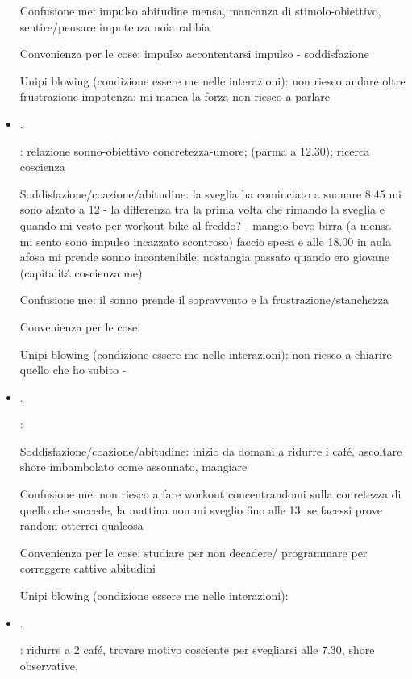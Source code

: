 \begin{itemize}
Confusione me: impulso abitudine mensa, mancanza di stimolo-obiettivo, sentire/pensare impotenza noia rabbia

Convenienza per le cose: impulso accontentarsi impulso - soddisfazione 

Unipi blowing (condizione essere me nelle interazioni): non riesco andare oltre frustrazione impotenza: mi manca la forza non riesco a parlare

\item {}.

: relazione sonno-obiettivo concretezza-umore; (parma a 12.30); ricerca coscienza

Soddisfazione/coazione/abitudine: la sveglia ha cominciato a suonare 8.45 mi sono alzato a 12 - la differenza tra la prima volta che rimando la sveglia e quando mi vesto per workout bike al freddo? - mangio bevo birra (a mensa mi sento sono impulso incazzato scontroso) faccio spesa e alle 18.00 in aula afosa mi prende sonno incontenibile; nostangia passato quando ero giovane (capitalit\'a coscienza me)

Confusione me: il sonno prende il sopravvento e la frustrazione/stanchezza

Convenienza per le cose:

Unipi blowing (condizione essere me nelle interazioni): non riesco a chiarire quello che ho subito - 

\item {}.

:

Soddisfazione/coazione/abitudine: inizio da domani a ridurre i caf\'e, ascoltare shore imbambolato come assonnato, mangiare

Confusione me: non riesco a fare workout concentrandomi sulla conretezza di quello che succede, la mattina non mi sveglio fino alle 13: se facessi prove random otterrei qualcosa

Convenienza per le cose: studiare per non decadere/ programmare per correggere cattive abitudini

Unipi blowing (condizione essere me nelle interazioni):

\item {}.

: ridurre a 2 caf\'e, trovare motivo cosciente per svegliarsi alle 7.30, shore observative,


\end{itemize}
